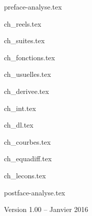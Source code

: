 \documentclass[11pt,twoside,openright]{report}
\begin{document}
\renewcommand{\contentsname}{Sommaire}

{preface-analyse.tex}

\debutchapitres



{ch_reels.tex}

{ch_suites.tex}

{ch_fonctions.tex}

{ch_usuelles.tex}

{ch_derivee.tex}



{ch_int.tex}

{ch_dl.tex}

{ch_courbes.tex}

{ch_equadiff.tex}



{ch_lecons.tex}


{postface-analyse.tex}

\vfill

\centerline{Version 1.00 -- Janvier 2016}
\end{document}

